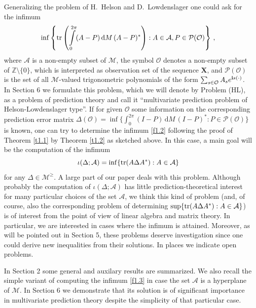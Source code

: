 \documentclass{amsart}
\begin{document}
Generalizing the problem of H.~Helson and D.~Lowdenslager one could ask for the infimum
\begin{equation}  \label{f1.2}
    \inf \left\{ {\rm tr} \left(\int\limits_{0}^{2 \pi}  (A-P) \, {\mathrm d}M \, (A-P)^* \right) : A \in {\mathcal A}, P \in {\mathcal P}({\mathcal O}) \right\} \, ,
\end{equation}
where $\mathcal A$ is a non-empty subset of $\mathcal M$, the symbol $\mathcal O$ denotes a non-empty subset of ${\mathbb Z} \setminus \{ 0 \}$, which is interpreted as observation set of the sequence ${\mathbf X}$, and ${\mathcal P}({\mathcal O})$ is the set of all $\mathcal M$-valued trigonometric polynomials of the form $\sum_{s \in  {\mathcal O}} A_s e^{{\bf i}s(\cdot)}$. In Section 6 we formulate this problem, which we will denote by Problem (HL), as a problem of prediction theory and call it ``multivariate prediction problem of Helson-Lowdenslager type''. If for given $\mathcal O$ some information on the corresponding prediction error matrix $\Delta ({\mathcal O}) = \inf \{ \int_{0}^{2 \pi} (I-P) \, {\mathrm d} M \, (I-P)^* : P \in {\mathcal P}({\mathcal O}) \}$ is known, one can try to determine the infimum \eqref{f1.2} following the proof of Theorem \ref{t1.1} by Theorem \ref{t1.2} as sketched above. In this case, a main goal will be the computation of the infimum 
\begin{equation}    \label{f1.3}
     \iota (\Delta ; {\mathcal A}) = \inf \{ {\rm tr} (A \Delta A^*): A \in {\mathcal A} \}
\end{equation}
for any $\Delta \in {\mathcal M}^\geq$. A large part of our paper deals with this problem. Although probably the computation of $\iota (\Delta ; {\mathcal A} )$ has little prediction-theoretical interest for many particular choices of the set $\mathcal A$, we think this kind of problem (and, of course, also the corresponding problem of determining $\sup \{ {\rm tr} (A \Delta A^*): A \in {\mathcal A} \}$) is of interest from the point of view of linear algebra and matrix theory. In particular, we are interested in cases where the infimum is attained. Moreover, as will be pointed out in Section 5, these problems deserve investigation since one could derive new inequalities from their solutions. In places we indicate open problems. 

In Section 2 some general and auxilary results are summarized. We also recall the simple variant of computing the infimum \eqref{f1.3} in case the set $\mathcal A$ is a hyperplane of $\mathcal M$. In Section 6 we demonstrate that its solution is of significant importance in multivariate prediction theory despite the simplicity of that particular case. 
\end{document}
